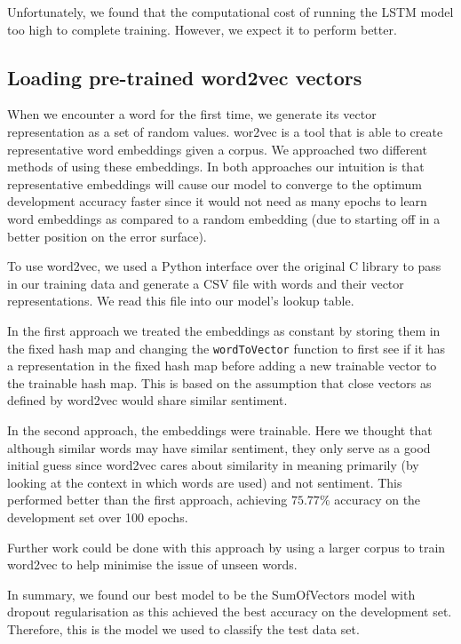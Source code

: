 \documentclass{article} %
\begin{document}
Unfortunately, we found that the computational cost of running the LSTM model too high to complete training. However, we expect it to perform better.

\subsection{Loading pre-trained word2vec vectors}

When we encounter a word for the first time, we generate its vector representation as a set of random values. wor2vec is a tool that is able to create representative word embeddings given a corpus. We approached two different methods of using these embeddings. In both approaches our intuition is that representative embeddings will cause our model to converge to the optimum development accuracy faster since it would not need as many epochs to learn word embeddings as compared to a random embedding (due to starting off in a better position on the error surface).

To use word2vec, we used a Python interface over the original C library to pass in our training data and generate a CSV file with words and their vector representations. We read this file into our model's lookup table.

In the first approach we treated the embeddings as constant by storing them in the fixed hash map and changing the \texttt{wordToVector} function to first see if it has a representation in the fixed hash map before adding a new trainable vector to the trainable hash map. This is based on the assumption that close vectors as defined by word2vec would share similar sentiment.

In the second approach, the embeddings were trainable. Here we thought that although similar words may have similar sentiment, they only serve as a good initial guess since word2vec cares about similarity in meaning primarily (by looking at the context in which words are used) and not sentiment. This performed better than the first approach, achieving $75.77\%$ accuracy on the development set over 100 epochs.

Further work could be done with this approach by using a larger corpus to train word2vec to help minimise the issue of unseen words. 

In summary, we found our best model to be the SumOfVectors model with dropout regularisation as this achieved the best accuracy on the development set. Therefore, this is the model we used to classify the test data set.
\end{document}
